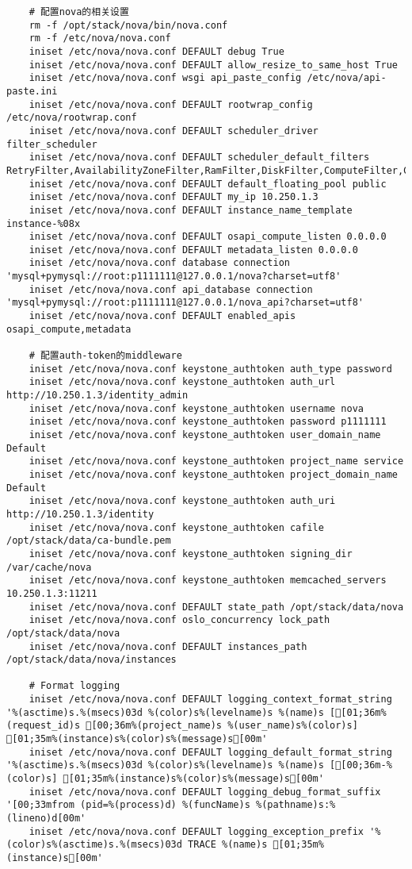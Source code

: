 \documentclass[a4paper,left=1.5cm,right=1.5cm,11pt]{article}
\begin{document}
\begin{lstlisting}
	# 配置nova的相关设置
	rm -f /opt/stack/nova/bin/nova.conf
	rm -f /etc/nova/nova.conf
	iniset /etc/nova/nova.conf DEFAULT debug True
    iniset /etc/nova/nova.conf DEFAULT allow_resize_to_same_host True
    iniset /etc/nova/nova.conf wsgi api_paste_config /etc/nova/api-paste.ini
    iniset /etc/nova/nova.conf DEFAULT rootwrap_config /etc/nova/rootwrap.conf
    iniset /etc/nova/nova.conf DEFAULT scheduler_driver filter_scheduler
    iniset /etc/nova/nova.conf DEFAULT scheduler_default_filters RetryFilter,AvailabilityZoneFilter,RamFilter,DiskFilter,ComputeFilter,ComputeCapabilitiesFilter,ImagePropertiesFilter,ServerGroupAntiAffinityFilter,ServerGroupAffinityFilter,SameHostFilter,DifferentHostFilter
    iniset /etc/nova/nova.conf DEFAULT default_floating_pool public
	iniset /etc/nova/nova.conf DEFAULT my_ip 10.250.1.3
    iniset /etc/nova/nova.conf DEFAULT instance_name_template instance-%08x
    iniset /etc/nova/nova.conf DEFAULT osapi_compute_listen 0.0.0.0
    iniset /etc/nova/nova.conf DEFAULT metadata_listen 0.0.0.0
	iniset /etc/nova/nova.conf database connection 'mysql+pymysql://root:p1111111@127.0.0.1/nova?charset=utf8'
	iniset /etc/nova/nova.conf api_database connection 'mysql+pymysql://root:p1111111@127.0.0.1/nova_api?charset=utf8'
	iniset /etc/nova/nova.conf DEFAULT enabled_apis osapi_compute,metadata

	# 配置auth-token的middleware
	iniset /etc/nova/nova.conf keystone_authtoken auth_type password
    iniset /etc/nova/nova.conf keystone_authtoken auth_url http://10.250.1.3/identity_admin
    iniset /etc/nova/nova.conf keystone_authtoken username nova
    iniset /etc/nova/nova.conf keystone_authtoken password p1111111
    iniset /etc/nova/nova.conf keystone_authtoken user_domain_name Default
    iniset /etc/nova/nova.conf keystone_authtoken project_name service
    iniset /etc/nova/nova.conf keystone_authtoken project_domain_name Default
    iniset /etc/nova/nova.conf keystone_authtoken auth_uri http://10.250.1.3/identity
    iniset /etc/nova/nova.conf keystone_authtoken cafile /opt/stack/data/ca-bundle.pem
    iniset /etc/nova/nova.conf keystone_authtoken signing_dir /var/cache/nova
    iniset /etc/nova/nova.conf keystone_authtoken memcached_servers 10.250.1.3:11211
	iniset /etc/nova/nova.conf DEFAULT state_path /opt/stack/data/nova
    iniset /etc/nova/nova.conf oslo_concurrency lock_path /opt/stack/data/nova
	iniset /etc/nova/nova.conf DEFAULT instances_path /opt/stack/data/nova/instances

	# Format logging
	iniset /etc/nova/nova.conf DEFAULT logging_context_format_string '%(asctime)s.%(msecs)03d %(color)s%(levelname)s %(name)s [[01;36m%(request_id)s [00;36m%(project_name)s %(user_name)s%(color)s] [01;35m%(instance)s%(color)s%(message)s[00m'
    iniset /etc/nova/nova.conf DEFAULT logging_default_format_string '%(asctime)s.%(msecs)03d %(color)s%(levelname)s %(name)s [[00;36m-%(color)s] [01;35m%(instance)s%(color)s%(message)s[00m'
    iniset /etc/nova/nova.conf DEFAULT logging_debug_format_suffix '[00;33mfrom (pid=%(process)d) %(funcName)s %(pathname)s:%(lineno)d[00m'
    iniset /etc/nova/nova.conf DEFAULT logging_exception_prefix '%(color)s%(asctime)s.%(msecs)03d TRACE %(name)s [01;35m%(instance)s[00m'


\end{lstlisting}
\end{document}

